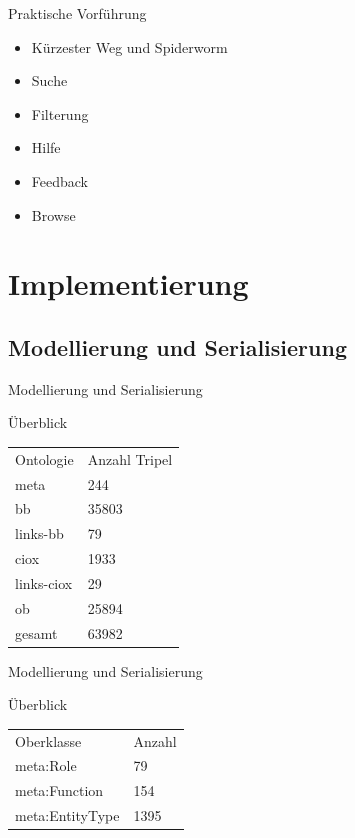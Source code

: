 \documentclass[14pt,aspectratio=1610]{beamer}
\begin{document}
\begin{frame}{Praktische Vorführung}
\begin{itemize}
\item Kürzester Weg und Spiderworm
\item Suche
\item Filterung
\item Hilfe
\item Feedback
\item Browse
\end{itemize}
\end{frame}

\section{Implementierung}%

\subsection{Modellierung und Serialisierung}%


\begin{frame}{Modellierung und Serialisierung}
\begin{block}{Überblick}
\begin{tabular}{ll}
Ontologie	&Anzahl Tripel\\
meta	&244\\
bb	&35803\\
links-bb	&79\\
ciox	&1933\\
links-ciox	&29\\
ob	&25894\\
gesamt	&63982\\
\end{tabular}
\end{block}
\end{frame}

\begin{frame}{Modellierung und Serialisierung}
\begin{block}{Überblick}
\begin{tabular}{ll}
Oberklasse	&Anzahl\\
meta:Role	&79\\
meta:Function	&154\\
meta:EntityType	&1395\\
\end{tabular}
\end{block}
\end{frame}
\end{document}
